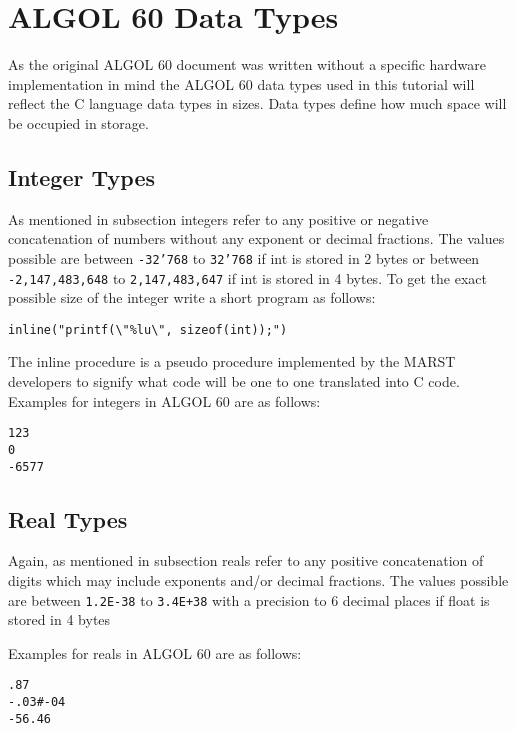 \documentclass{article}
\begin{document}
\newpage

\section{ALGOL 60 Data Types} \label{datatypes}
As the original ALGOL 60 document was written without a specific hardware implementation in mind the ALGOL 60 data types used in this tutorial will reflect the C language data types in sizes. Data types define how much space will be occupied in storage.

\subsection{Integer Types}
As mentioned in subsection  integers refer to any positive or negative concatenation of numbers without any exponent or decimal fractions. The values possible are between \texttt{-32'768} to \texttt{32'768} if int is stored in 2 bytes or between \texttt{-2,147,483,648} to \texttt{2,147,483,647} if int is stored in 4 bytes. To get the exact possible size of the integer write a short program as follows:

\begin{lstlisting}[language={[60]algol}]
inline("printf(\"%lu\", sizeof(int));")
\end{lstlisting}

The inline procedure is a pseudo procedure implemented by the MARST developers to signify what code will be one to one translated into C code. \\

Examples for integers in ALGOL 60 are as follows:

\begin{lstlisting}[language={[60]algol}]
123
0
-6577
\end{lstlisting}

\subsection{Real Types}
Again, as mentioned in subsection  reals refer to any positive concatenation of digits which may include exponents and/or decimal fractions. The values possible are between \texttt{1.2E-38} to \texttt{3.4E+38} with a precision to 6 decimal places if float is stored in 4 bytes

Examples for reals in ALGOL 60 are as follows:

\begin{lstlisting}[language={[60]algol}]
.87
-.03#-04
-56.46
\end{lstlisting}
\end{document}
